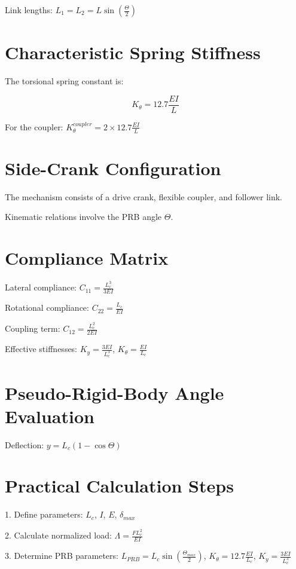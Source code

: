 \documentclass{article}
\begin{document}
Link lengths: $L_1 = L_2 = L \sin\left(\frac{\Theta}{2}\right)$

\section{Characteristic Spring Stiffness}

The torsional spring constant is:

\[ K_\theta = 12.7 \frac{EI}{L} \]

For the coupler: $K_\theta^{coupler} = 2 \times 12.7 \frac{EI}{L}$

\section{Side-Crank Configuration}

The mechanism consists of a drive crank, flexible coupler, and follower link.

Kinematic relations involve the PRB angle $\Theta$.

\section{Compliance Matrix}

Lateral compliance: $C_{11} = \frac{L_c^3}{3EI}$

Rotational compliance: $C_{22} = \frac{L_c}{EI}$

Coupling term: $C_{12} = \frac{L_c^2}{2EI}$

Effective stiffnesses: $K_y = \frac{3EI}{L_c^3}$, $K_\theta = \frac{EI}{L_c}$

\section{Pseudo-Rigid-Body Angle Evaluation}

Deflection: $y = L_c (1 - \cos\Theta)$

\section{Practical Calculation Steps}

1. Define parameters: $L_c$, $I$, $E$, $\delta_{max}$

2. Calculate normalized load: $\Lambda = \frac{FL_c^2}{EI}$

3. Determine PRB parameters: $L_{PRB} = L_c \sin\left(\frac{\Theta_{max}}{2}\right)$, $K_\theta = 12.7 \frac{EI}{L_c}$, $K_y = \frac{3EI}{L_c^3}$
\end{document}
